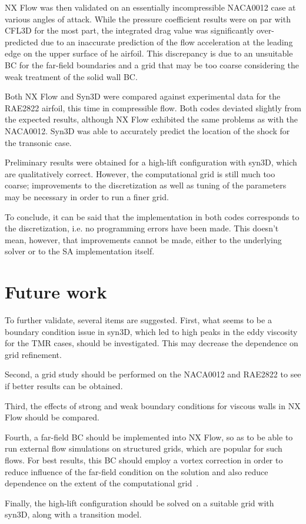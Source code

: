 NX Flow was then validated on an essentially incompressible NACA0012 case at various angles of attack. While the pressure coefficient results were on par with CFL3D for the most part, the integrated drag value was significantly over-predicted due to an inaccurate prediction of the flow acceleration at the leading edge on the upper surface of he airfoil. This discrepancy is due to an unsuitable BC for the far-field boundaries and a grid that may be too coarse considering the weak treatment of the solid wall BC.

Both NX Flow and Syn3D were compared against experimental data for the RAE2822 airfoil, this time in compressible flow. Both codes deviated slightly from the expected results, although NX Flow exhibited the same problems as with the NACA0012. Syn3D was able to accurately predict the location of the shock for the transonic case.

Preliminary results were obtained for a high-lift configuration with syn3D, which are qualitatively correct. However, the computational grid is still much too coarse; improvements to the discretization as well as tuning of the parameters may be necessary in order to run a finer grid.

To conclude, it can be said that the implementation in both codes corresponds to the discretization, i.e. no programming errors have been made. This doesn't mean, however, that improvements cannot be made, either to the underlying solver or to the SA implementation itself.

\section{Future work}
\label{sec:future}
To further validate, several items are suggested.
First, what seems to be a boundary condition issue in syn3D, which led to high peaks in the eddy viscosity for the TMR cases, should be investigated. This may decrease the dependence on grid refinement.

Second, a grid study should be performed on the NACA0012 and RAE2822 to see if better results can be obtained.

Third, the effects of strong and weak boundary conditions for viscous walls in NX Flow should be compared.

Fourth, a far-field BC should be implemented into NX Flow, so as to be able to run external flow simulations on structured grids, which are popular for such flows. For best results, this BC should employ a vortex correction in order to reduce influence of the far-field condition on the solution and also reduce dependence on the extent of the computational grid~\cite{tmrvortex,thomas1986far}.

Finally, the high-lift configuration should be solved on a suitable grid with syn3D, along with a transition model.
